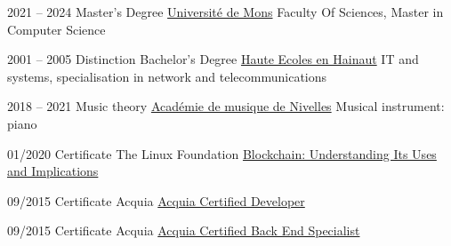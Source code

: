 \begin{minipage}[t]{.48\textwidth}

    \begin{entrylist}
		\entry
			{\tiny{2021 -- 2024}}
            {}
			{Master's Degree}
            {\href{https://www.umons.be/}{Université de Mons}}
			{Faculty Of Sciences, Master in Computer Science}
	\end{entrylist}

	\begin{entrylist}
		\entry
			{\tiny{2001 -- 2005}}
            {Distinction}
			{Bachelor's Degree}
            {\href{https://www.heh.be/}{Haute Ecoles en Hainaut}}
			{IT and systems, specialisation in network and telecommunications}
	\end{entrylist}

	\begin{entrylist}
		\entry
			{\tiny{2018 -- 2021}}
            {}
			{Music theory}
            {\href{https://academiedenivelles.be/}{Académie de musique de Nivelles}}
			{Musical instrument: piano}
	\end{entrylist}
\end{minipage}
\hfill
\begin{minipage}[t]{.48\textwidth}
	\cvsect{Certificates}

	\begin{entrylist}
		\entry
			{01/2020}
            {}
			{Certificate}
			{The Linux Foundation}
			{\href{https://courses.edx.org/certificates/01fdb9d9242546e8bc45153468dfd785}{Blockchain: Understanding Its Uses and Implications}}
	\end{entrylist}

	\begin{entrylist}
		\entry
			{09/2015}
            {}
			{Certificate}
			{Acquia}
			{\href{https://certification.acquia.com/user/249}{Acquia Certified Developer}}
	\end{entrylist}

	\begin{entrylist}
		\entry
			{09/2015}
            {}
			{Certificate}
			{Acquia}
			{\href{https://certification.acquia.com/user/249}{Acquia Certified Back End Specialist}}
	\end{entrylist}
\end{minipage}



